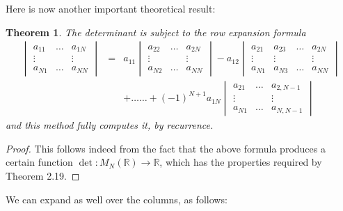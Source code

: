 \documentclass[12pt]{amsbook}
\newtheorem{theorem}{Theorem}[chapter]
\begin{document}
Here is now another important theoretical result:


\begin{theorem}
The determinant is subject to the row expansion formula
\begin{eqnarray*}
\begin{vmatrix}a_{11}&\ldots&a_{1N}\\
\vdots&&\vdots\\
a_{N1}&\ldots&a_{NN}\end{vmatrix}
&=&a_{11}\begin{vmatrix}a_{22}&\ldots&a_{2N}\\
\vdots&&\vdots\\
a_{N2}&\ldots&a_{NN}\end{vmatrix}
-a_{12}\begin{vmatrix}a_{21}&a_{23}&\ldots&a_{2N}\\
\vdots&\vdots&&\vdots\\
a_{N1}&a_{N3}&\ldots&a_{NN}\end{vmatrix}\\
&&+\ldots\ldots
+(-1)^{N+1}a_{1N}\begin{vmatrix}a_{21}&\ldots&a_{2,N-1}\\
\vdots&&\vdots\\
a_{N1}&\ldots&a_{N,N-1}\end{vmatrix}
\end{eqnarray*}
and this method fully computes it, by recurrence.
\end{theorem}

\begin{proof}
This follows indeed from the fact that the above formula produces a certain function $\det:M_N(\mathbb R)\to\mathbb R$, which has the properties required by Theorem 2.19.
\end{proof}

We can expand as well over the columns, as follows:

\end{document}
